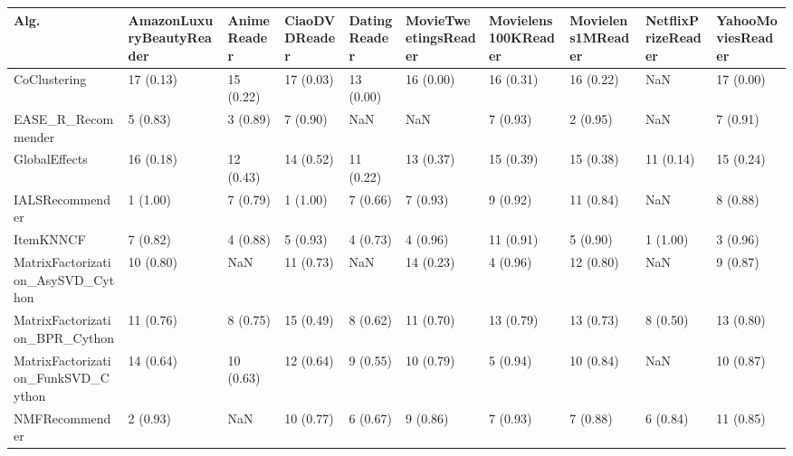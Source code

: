 \begin{tabular}{llllllllll}
\toprule
                               Alg. & AmazonLuxuryBeautyReader & AnimeReader & CiaoDVDReader & DatingReader & MovieTweetingsReader & Movielens100KReader & Movielens1MReader & NetflixPrizeReader & YahooMoviesReader \\
\midrule
                       CoClustering &                17 (0.13) &   15 (0.22) &     17 (0.03) &    13 (0.00) &            16 (0.00) &           16 (0.31) &         16 (0.22) &                NaN &         17 (0.00) \\
                 EASE\_R\_Recommender &                 5 (0.83) &    3 (0.89) &      7 (0.90) &          NaN &                  NaN &            7 (0.93) &          2 (0.95) &                NaN &          7 (0.91) \\
                      GlobalEffects &                16 (0.18) &   12 (0.43) &     14 (0.52) &    11 (0.22) &            13 (0.37) &           15 (0.39) &         15 (0.38) &          11 (0.14) &         15 (0.24) \\
                    IALSRecommender &                 1 (1.00) &    7 (0.79) &      1 (1.00) &     7 (0.66) &             7 (0.93) &            9 (0.92) &         11 (0.84) &                NaN &          8 (0.88) \\
                          ItemKNNCF &                 7 (0.82) &    4 (0.88) &      5 (0.93) &     4 (0.73) &             4 (0.96) &           11 (0.91) &          5 (0.90) &           1 (1.00) &          3 (0.96) \\
  MatrixFactorization\_AsySVD\_Cython &                10 (0.80) &         NaN &     11 (0.73) &          NaN &            14 (0.23) &            4 (0.96) &         12 (0.80) &                NaN &          9 (0.87) \\
     MatrixFactorization\_BPR\_Cython &                11 (0.76) &    8 (0.75) &     15 (0.49) &     8 (0.62) &            11 (0.70) &           13 (0.79) &         13 (0.73) &           8 (0.50) &         13 (0.80) \\
 MatrixFactorization\_FunkSVD\_Cython &                14 (0.64) &   10 (0.63) &     12 (0.64) &     9 (0.55) &            10 (0.79) &            5 (0.94) &         10 (0.84) &                NaN &         10 (0.87) \\
                     NMFRecommender &                 2 (0.93) &         NaN &     10 (0.77) &     6 (0.67) &             9 (0.86) &            7 (0.93) &          7 (0.88) &           6 (0.84) &         11 (0.85) \\

\end{tabular}
